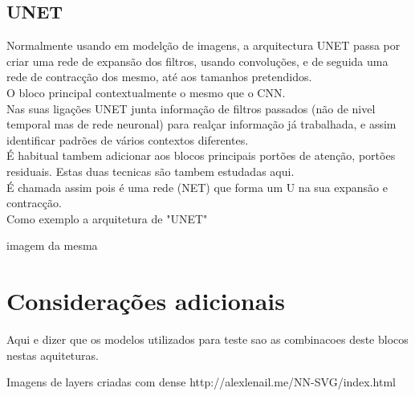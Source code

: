 \subsection{UNET\label{se:UNET}}

Normalmente usando em modelção de imagens, a arquitectura UNET passa por criar uma rede de expansão dos filtros, usando convoluções, e de seguida uma rede de contracção dos mesmo, até aos tamanhos pretendidos.\\
O bloco principal contextualmente o mesmo que o CNN.\\
Nas suas ligações UNET junta informação de filtros passados (não de nivel temporal mas de rede neuronal) para realçar informação já trabalhada, e assim identificar padrões de vários contextos diferentes.\\
É habitual tambem adicionar aos blocos principais portões de atenção, portões residuais. Estas duas tecnicas são tambem estudadas aqui.\\
É chamada assim pois é uma rede (NET) que forma um U na sua expansão e contracção.\\

Como exemplo a arquitetura de "UNET"

imagem da mesma


\section{Considerações adicionais\label{se:modelos_plus}}

Aqui e dizer que os modelos utilizados para teste sao as combinacoes deste blocos nestas aquiteturas.

Imagens de layers criadas com 
dense
http://alexlenail.me/NN-SVG/index.html